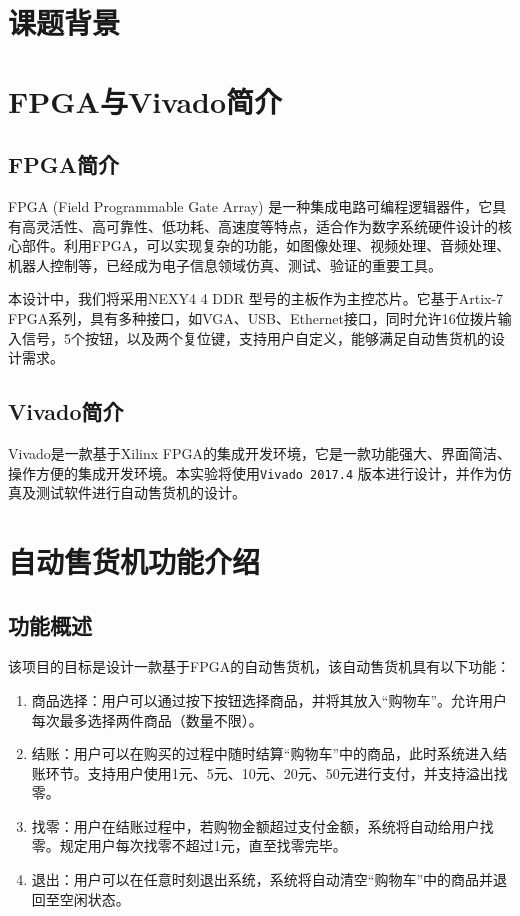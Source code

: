 \documentclass[12pt]{SEU-Circuit-Report}
\begin{document}
    \exptitlepage
    \section{课题背景}
    
    \section{FPGA与Vivado简介}
    
    \subsection{FPGA简介}
    FPGA (Field Programmable Gate Array) 是一种集成电路可编程逻辑器件，它具有高灵活性、高可靠性、低功耗、高速度等特点，适合作为数字系统硬件设计的核心部件。利用FPGA，可以实现复杂的功能，如图像处理、视频处理、音频处理、机器人控制等，已经成为电子信息领域仿真、测试、验证的重要工具。

    本设计中，我们将采用NEXY4 4 DDR 型号的主板作为主控芯片。它基于Artix-7 FPGA系列，具有多种接口，如VGA、USB、Ethernet接口，同时允许16位拨片输入信号，5个按钮，以及两个复位键，支持用户自定义，能够满足自动售货机的设计需求。
    \subsection{Vivado简介}
    Vivado是一款基于Xilinx FPGA的集成开发环境，它是一款功能强大、界面简洁、操作方便的集成开发环境。本实验将使用\texttt{Vivado 2017.4} 版本进行设计，并作为仿真及测试软件进行自动售货机的设计。
    \section{自动售货机功能介绍}
    \subsection{功能概述}
    该项目的目标是设计一款基于FPGA的自动售货机，该自动售货机具有以下功能：
    \begin{enumerate}
        \item 商品选择：用户可以通过按下按钮选择商品，并将其放入“购物车”。允许用户每次最多选择两件商品（数量不限）。
        \item 结账：用户可以在购买的过程中随时结算“购物车”中的商品，此时系统进入结账环节。支持用户使用1元、5元、10元、20元、50元进行支付，并支持溢出找零。
        \item 找零：用户在结账过程中，若购物金额超过支付金额，系统将自动给用户找零。规定用户每次找零不超过1元，直至找零完毕。
        \item 退出：用户可以在任意时刻退出系统，系统将自动清空“购物车”中的商品并退回至空闲状态。
    \end{enumerate}
\end{document}
